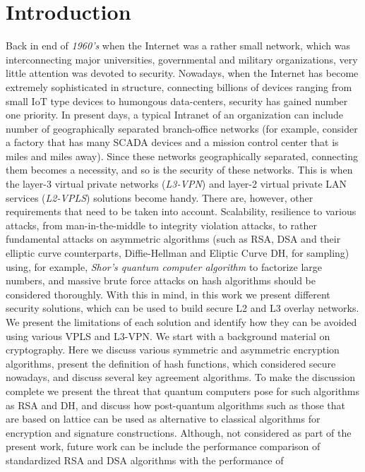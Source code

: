 \chapter{Introduction}

Back in end of {\it 1960’s} when the Internet was a rather small 
network, which was interconnecting major universities, governmental 
and military organizations, very little attention was devoted to 
security. Nowadays, when the Internet has become extremely 
sophisticated in structure, connecting billions of devices ranging 
from small IoT type devices to humongous data-centers, security has 
gained number one priority. In present days, a typical Intranet of 
an organization can include number of geographically separated 
branch-office networks (for example, consider a factory that has 
many SCADA devices and a mission control center that is miles and 
miles away). Since these networks geographically separated, connecting 
them becomes a necessity, and so is the security of these networks. 
This is when the layer-3 virtual private networks ({\it L3-VPN}) and layer-2 
virtual private LAN services ({\it L2-VPLS}) solutions become handy. 
There are, however, other requirements that need to be taken into 
account. Scalability, resilience to various attacks, from man-in-the-middle 
to integrity violation attacks, to rather fundamental attacks on 
asymmetric algorithms (such as RSA, DSA and their elliptic curve 
counterparts, Diffie-Hellman and Eliptic Curve DH, for sampling) 
using, for example, {\it Shor’s quantum computer algorithm} to factorize 
large numbers, and massive brute force attacks on hash algorithms 
should be considered thoroughly. With this in mind, in this work we 
present different security solutions, which can be used to build secure 
L2 and L3 overlay networks. We present the limitations of each solution 
and identify how they can be avoided using various VPLS and L3-VPN.
We start with a background material on cryptography. 
Here we discuss various symmetric and asymmetric encryption algorithms, 
present the definition of hash functions, which considered secure nowadays, 
and discuss several key agreement algorithms. To make the discussion 
complete we present the threat that quantum computers pose for such 
algorithms as RSA and DH, and discuss how post-quantum algorithms such 
as those that are based on lattice can be used as alternative to classical 
algorithms for encryption and signature constructions. Although, not considered 
as part of the present work, future work can be include the performance 
comparison of standardized RSA and DSA algorithms with the performance of 
